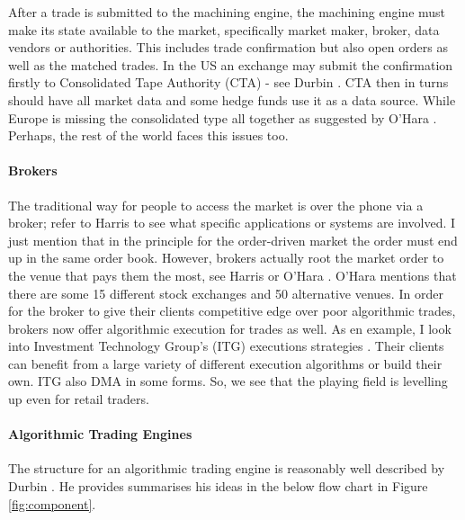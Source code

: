 \documentclass[12pt]{article}
\begin{document}
After a trade is submitted to the machining engine, the machining engine must make its state available to the market, specifically market maker, broker, data vendors or authorities. This includes trade confirmation but also open orders as well as the matched trades. In the US an exchange may submit the confirmation firstly to Consolidated Tape Authority (CTA) - see Durbin \cite{durbin}. CTA then in turns should have all market data and some hedge funds use it as a data source. While Europe is missing the consolidated type all together as suggested by O'Hara \cite{ohara}. Perhaps, the rest of the world faces this issues too.

\paragraph*{Brokers} The traditional way for people to access the market is over the phone via a broker; refer to Harris \cite{harris} to see what specific applications or systems are involved. I just mention that in the principle for the order-driven market the order must end up in the same order book. However, brokers actually root the market order to the venue that pays them the most, see Harris \cite{harris} or O'Hara \cite{ohara}. O'Hara mentions that there are some 15 different stock exchanges and 50 alternative venues.
In order for the broker to give their clients competitive edge over poor algorithmic trades, brokers now offer algorithmic execution for trades as well. As en example, I look into Investment Technology Group's (ITG) executions strategies \cite{itg}. Their clients can benefit from a large variety of  different execution algorithms or build their own. ITG also DMA in some forms. So, we see that the playing field is levelling up even for retail traders.

\paragraph{Algorithmic Trading Engines} The structure for an algorithmic trading engine is reasonably well described by Durbin \cite{durbin}. He provides summarises his ideas in the below flow chart in Figure \ref{fig:component}.
\end{document}
